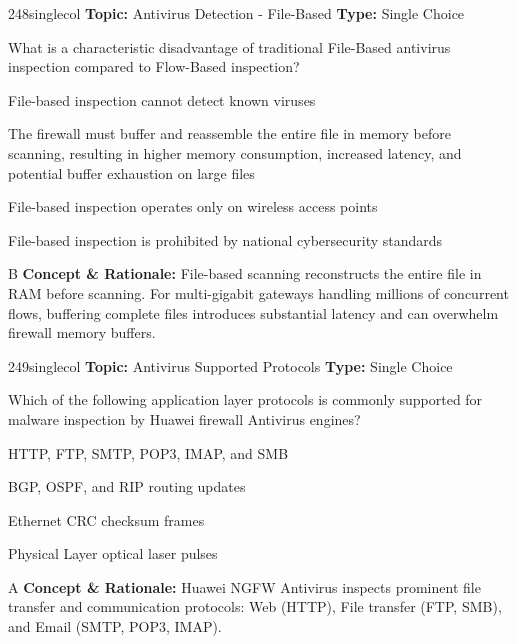 \begin{qcard}{248}{singlecol}
\textcolor{darkslate!75}{\small\textbf{Topic:} Antivirus Detection - File-Based \hfill \textbf{Type:} Single Choice}\vspace{0.4em}\par
What is a characteristic disadvantage of traditional File-Based antivirus inspection compared to Flow-Based inspection?
\begin{qoptions}
\item File-based inspection cannot detect known viruses
\item The firewall must buffer and reassemble the entire file in memory before scanning, resulting in higher memory consumption, increased latency, and potential buffer exhaustion on large files
\item File-based inspection operates only on wireless access points
\item File-based inspection is prohibited by national cybersecurity standards
\end{qoptions}
\end{qcard}
\nopagebreak
\begin{explainbox}{B}
\textbf{Concept \& Rationale:} File-based scanning reconstructs the entire file in RAM before scanning. For multi-gigabit gateways handling millions of concurrent flows, buffering complete files introduces substantial latency and can overwhelm firewall memory buffers.
\end{explainbox}

\begin{qcard}{249}{singlecol}
\textcolor{darkslate!75}{\small\textbf{Topic:} Antivirus Supported Protocols \hfill \textbf{Type:} Single Choice}\vspace{0.4em}\par
Which of the following application layer protocols is commonly supported for malware inspection by Huawei firewall Antivirus engines?
\begin{qoptions}
\item HTTP, FTP, SMTP, POP3, IMAP, and SMB
\item BGP, OSPF, and RIP routing updates
\item Ethernet CRC checksum frames
\item Physical Layer optical laser pulses
\end{qoptions}
\end{qcard}
\nopagebreak
\begin{explainbox}{A}
\textbf{Concept \& Rationale:} Huawei NGFW Antivirus inspects prominent file transfer and communication protocols: Web (HTTP), File transfer (FTP, SMB), and Email (SMTP, POP3, IMAP).
\end{explainbox}

